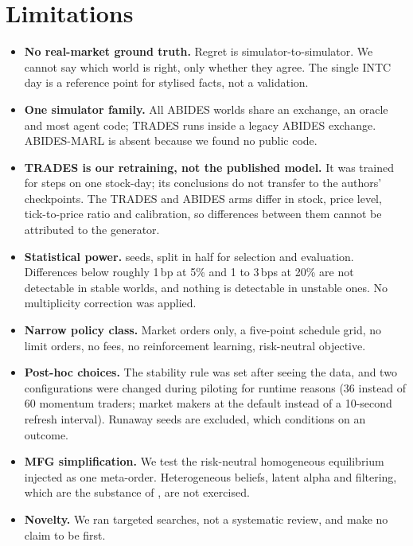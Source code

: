 \section{Limitations}
\label{sec:limits}

\begin{itemize}[leftmargin=*,itemsep=2pt]
\item \textbf{No real-market ground truth.} Regret is simulator-to-simulator. We cannot say which world is right, only whether they agree. The single INTC day is a reference point for stylised facts, not a validation.
\item \textbf{One simulator family.} All ABIDES worlds share an exchange, an oracle and most agent code; TRADES runs inside a legacy ABIDES exchange. ABIDES-MARL is absent because we found no public code.
\item \textbf{TRADES is our retraining, not the published model.} It was trained for \tradesSteps{} steps on one stock-day; its conclusions do not transfer to the authors' checkpoints. The TRADES and ABIDES arms differ in stock, price level, tick-to-price ratio and calibration, so differences between them cannot be attributed to the generator.
\item \textbf{Statistical power.} \nSeeds{} seeds, split in half for selection and evaluation. Differences below roughly 1\,bp at 5\% and 1 to 3\,bps at 20\% are not detectable in stable worlds, and nothing is detectable in unstable ones. No multiplicity correction was applied.
\item \textbf{Narrow policy class.} Market orders only, a five-point schedule grid, no limit orders, no fees, no reinforcement learning, risk-neutral objective.
\item \textbf{Post-hoc choices.} The stability rule was set after seeing the data, and two configurations were changed during piloting for runtime reasons (36 instead of 60 momentum traders; market makers at the default instead of a 10-second refresh interval). Runaway seeds are excluded, which conditions on an outcome.
\item \textbf{MFG simplification.} We test the risk-neutral homogeneous equilibrium injected as one meta-order. Heterogeneous beliefs, latent alpha and filtering, which are the substance of \citet{casgrain2020mean}, are not exercised.
\item \textbf{Novelty.} We ran targeted searches, not a systematic review, and make no claim to be first.
\end{itemize}

